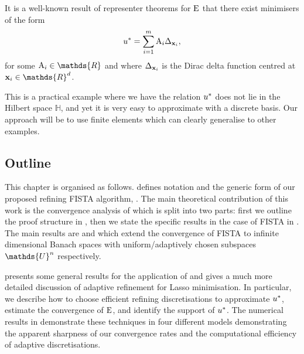 \documentclass[10pt,a4paper,onecolumn]{article}
\numberwithin{equation}{section}
\let\F\mathds\let\C\mathcal\newcommand{\R}{\F{R}}\newcommand{\A}{\C{A}}
\newcommand{\op}[1]{\operatorname{#1}}\newcommand{\overtext}[2]{\stackrel{\text{#1}}{#2}}
\renewcommand{\vec}{\mathbf}
\newcommand{\UCmath}[1]{%
	\begingroup
	\ucmathlist\uppercase\expandafter{#1}%
	\endgroup
}
\newcommand{\ucmathlist}{%
	\def\alpha{\mathrm{A}}%
	\def\beta{\mathrm{B}}%
	\let\gamma=\Gamma
	\let\delta=\Delta
	\def\epsilon{\mathrm{E}}%
	\def\varepsilon{\mathrm{E}}%
	\def\zeta{\mathrm{Z}}%
	\def\eta{\mathrm{H}}%
	\let\theta=\Theta
	\let\vartheta=\Theta
	\def\iota{\mathrm{I}}%
	\def\kappa{\mathrm{K}}%
	\let\lambda=\Lambda
	\def\mu{\mathrm{M}}%
	\def\nu{\mathrm{N}}%
	\let\xi=\Xi
	\let\pi=\Pi
	\let\varpi=\Pi
	\def\rho{\mathrm{P}}%
	\def\varrho{\mathrm{P}}%
	\let\sigma=\Sigma
	\def\tau{\mathrm{T}}%
	\let\upsilon=\Upsilon
	\let\phi=\Phi
	\let\varphi=\Phi
	\def\chi{\mathrm{X}}%
	\let\psi=\Psi
	\let\omega=\Omega
}
\newcommand{\caps}[1]{\UCmath{#1}}
\newcommand*{\Func}[1]{%
	\IfEqCase{#1}{%
		{0}{\op{E}}%
		{1}{\op{F}}%
		{2}{\op{G}}%
		{3}{\op{H}}%
	}[\op{F}#1]%
}
\newcommand*{\varf}[1]{%
	\IfEqCase{#1}{%
		{0}{u}%
		{1}{v}%
		{2}{w}%
	}[u#1]%
}
\newcommand*{\spcf}[1]{%
	\IfEqCase{#1}{%
		{0}{\F{U}}%
		{1}{\F{V}}%
		{2}{\F{W}}%
	}[\F{U}#1]%
}
\newcommand*{\varx}[1]{%
	\IfEqCase{#1}{%
		{0}{x}%
		{1}{y}%
		{2}{z}%
		{3}{r}%
	}[x#1]%
}
\newcommand*{\vars}[1]{%
	\IfEqCase{#1}{%
		{0}{\alpha}%
		{1}{\beta}%
		{2}{\gamma}%
		{3}{a}%
		{4}{b}%
		{5}{c}%
	}[k#1]%
}
\newcommand*{\Varx}[1]{\caps{\varx{#1}}}
\newcommand*{\vvarx}[1]{\vec{\varx{#1}}}\newcommand*{\vVarx}[1]{\vec{\Varx{#1}}}
\begin{document}
It is a well-known result of representer theorems for $\Func0$ \citep{Unser2016,Boyer2019} that there exist minimisers of the form 
\begin{equation}
	\varf0^* = \sum_{i=1}^{m}\vars0_i\delta_{\vvarx0_i}, 
\end{equation}
for some $\vars0_i\in\R$ and where $\delta_{\vvarx0_i}$ is the Dirac delta function centred at $\vvarx0_i\in\R^d$.

This is a practical example where we have the relation $\varf0^*$ does not lie in the Hilbert space $\F H$, and yet it is very easy to approximate with a discrete basis. Our approach will be to use finite elements which can clearly generalise to other examples.


\subsection{Outline}
This chapter is organised as follows.  defines notation and the generic form of our proposed refining FISTA algorithm, . The main theoretical contribution of this work is the convergence analysis of  which is split into two parts: first we outline the proof structure in , then we state the specific results in the case of FISTA in . The main results are  and  which extend the convergence of FISTA to infinite dimensional Banach spaces with uniform/adaptively chosen subspaces $\spcf0^n$ respectively.

 presents some general results for the application of  and  gives a much more detailed discussion of adaptive refinement for Lasso minimisation. In particular, we describe how to choose efficient refining discretisations to approximate $\varf0^*$, estimate the convergence of $\Func0$, and identify the support of $\varf0^*$. The numerical results in  demonstrate these techniques in four different models demonstrating the apparent sharpness of our convergence rates and the computational efficiency of adaptive discretisations.
\end{document}
